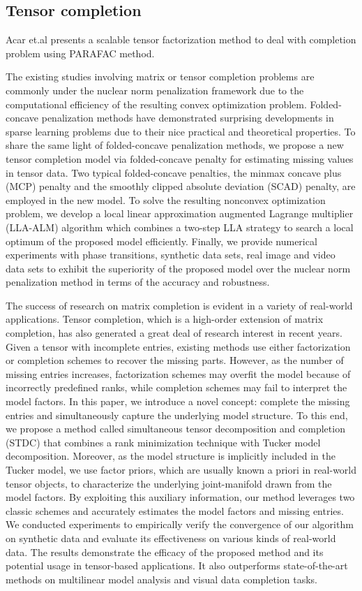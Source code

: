 \documentclass[letterpaper,12pt]{article}
\begin{document}
\subsection{Tensor completion}

Acar et.al \cite{Acar2011} presents a scalable tensor factorization method to deal with completion problem using PARAFAC method.

\cite{Cao2015} The existing studies involving matrix or tensor completion problems are commonly under the nuclear norm penalization framework due to the computational efficiency of the resulting convex optimization problem. Folded-concave penalization methods have demonstrated surprising developments in sparse learning problems due to their nice practical and theoretical properties. To share the same light of folded-concave penalization methods, we propose a new tensor completion model via folded-concave penalty for estimating missing values in tensor data. Two typical folded-concave penalties, the minmax concave plus (MCP) penalty and the smoothly clipped absolute deviation (SCAD) penalty, are employed in the new model. To solve the resulting nonconvex optimization problem, we develop a local linear approximation augmented Lagrange multiplier (LLA-ALM) algorithm which combines a two-step LLA strategy to search a local optimum of the proposed model efficiently. Finally, we provide numerical experiments with phase transitions, synthetic data sets, real image and video data sets to exhibit the superiority of the proposed model over the nuclear norm penalization method in terms of the accuracy and robustness.

\cite{Chen2014} The success of research on matrix completion is evident in a variety of real-world applications. Tensor completion, which is a high-order extension of matrix completion, has also generated a great deal of research interest in recent years. Given a tensor with incomplete entries, existing methods use either factorization or completion schemes to recover the missing parts. However, as the number of missing entries increases, factorization schemes may overfit the model because of incorrectly predefined ranks, while completion schemes may fail to interpret the model factors. In this paper, we introduce a novel concept: complete the missing entries and simultaneously capture the underlying model structure. To this end, we propose a method called simultaneous tensor decomposition and completion (STDC) that combines a rank minimization technique with Tucker model decomposition. Moreover, as the model structure is implicitly included in the Tucker model, we use factor priors, which are usually known a priori in real-world tensor objects, to characterize the underlying joint-manifold drawn from the model factors. By exploiting this auxiliary information, our method leverages two classic schemes and accurately estimates the model factors and missing entries. We conducted experiments to empirically verify the convergence of our algorithm on synthetic data and evaluate its effectiveness on various kinds of real-world data. The results demonstrate the efficacy of the proposed method and its potential usage in tensor-based applications. It also outperforms state-of-the-art methods on multilinear model analysis and visual data completion tasks.
\end{document}
